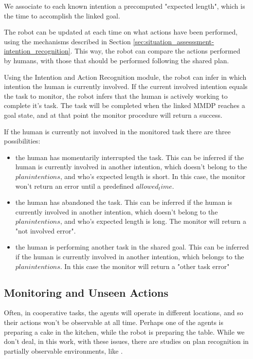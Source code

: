 We associate to each known intention a precomputed "expected length", which is the time to accomplish the linked goal.

The robot can be updated at each time on what actions have been performed, using the mechanisms described in Section \ref{sec:situation_assesssment-intention_recognition}. This way, the robot can compare the actions performed by humans, with those that should be performed following the shared plan.

Using the Intention and Action Recognition module, the robot can infer in which intention the human is currently involved. If the current involved intention equals the task to monitor, the robot infers that the human is actively working to complete it's task. The task will be completed when the linked MMDP reaches a goal state, and at that point the monitor procedure will return a success.

If the human is currently not involved in the monitored task there are three possibilities:
\begin{itemize}
	\item the human has momentarily interrupted the task. This can be inferred if the human is currently involved in another intention, which doesn't belong to the $plan intentions$, and who's expected length is short. In this case, the monitor won't return an error until a predefined $allowed_time$.
	\item the human has abandoned the task.  This can be inferred if the human is currently involved in another intention, which doesn't belong to the $plan intentions$, and who's expected length is long. The monitor will return a "not involved error". 
	\item the human is performing another task in the shared goal. This can be inferred if the human is currently involved in another intention, which belongs to the $plan intentions$. In this case the monitor will return a "other task error"
\end{itemize}


\subsection{Monitoring and Unseen Actions}
Often, in cooperative tasks, the agents will operate in different locations, and so their actions won't be observable at all time. Perhaps one of the agents is preparing a cake in the kitchen,  while the robot is preparing the table. While we don't deal, in this work, with these issues, there are studies on plan recognition in partially observable environments, like \cite{geib2005partial}.




